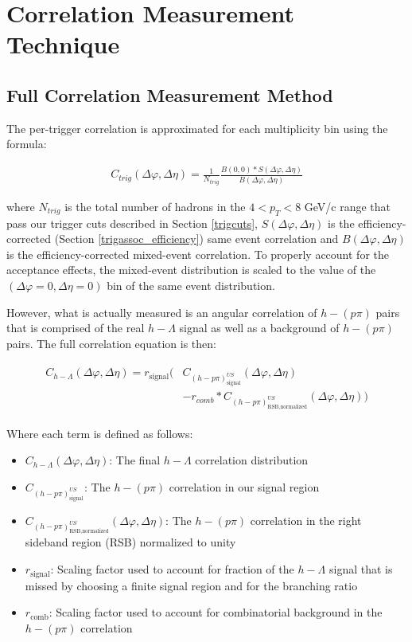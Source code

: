 \documentclass[ALICE,manyauthors]{ALICE_analysis_notes}
\begin{document}
\clearpage

\section{Correlation Measurement Technique}
\label{corrsec}

\subsection{Full Correlation Measurement Method}

The per-trigger correlation is approximated for each multiplicity bin using the formula:

\begin{align}
\label{corrEq}
C_{trig}(\Delta\varphi, \Delta\eta) = \frac{1}{N_{trig}}\frac{B(0,0)*S(\Delta\varphi,\Delta\eta)}{B(\Delta\varphi, \Delta\eta)}
\end{align}

where $N_{trig}$ is the total number of hadrons in the $4 < p_{T} < 8$ GeV/c range that pass our trigger cuts described in Section \ref{trigcuts}, $S(\Delta\varphi, \Delta\eta)$ is the efficiency-corrected (Section \ref{trigassoc_efficiency}) same event correlation and $B(\Delta\varphi, \Delta\eta)$ is the efficiency-corrected mixed-event correlation.  To properly account for the acceptance effects, the mixed-event distribution is scaled to the value of the $(\Delta\varphi = 0, \Delta\eta = 0)$ bin of the same event distribution.

However, what is actually measured is an angular correlation of $h-(p\pi)$ pairs that is comprised of the real $h-\Lambda$ signal as well as a background of $h-(p\pi)$ pairs. The full correlation equation is then:

\begin{align}
\label{corrEq_withBG}
\begin{split}
    C_{h-\Lambda}(\Delta\varphi, \Delta\eta) = r_{\text{signal}}\biggl(&C_{(h-p\pi)^{US}_{\text{signal}}}(\Delta\varphi, \Delta\eta)\\
    &- r_{comb}*C_{(h-p\pi)^{US}_{\text{RSB,normalized}}}(\Delta\varphi, \Delta\eta)\biggr)
\end{split}
\end{align}

Where each term is defined as follows:
\begin{itemize}
	\item $C_{h-\Lambda}(\Delta\varphi, \Delta\eta)$: The final $h-\Lambda$ correlation distribution
	\item $C_{(h-p\pi)^{US}_{\text{signal}}}$: The $h-(p\pi)$ correlation in our signal region
	\item $C_{(h-p\pi)^{US}_{\text{RSB,normalized}}}(\Delta\varphi, \Delta\eta)$: The $h-(p\pi)$ correlation in the right sideband region (RSB) normalized to unity
	\item $r_{\text{signal}}$: Scaling factor used to account for fraction of the $h-\Lambda$ signal that is missed by choosing a finite signal region and for the branching ratio
	\item $r_{\text{comb}}$: Scaling factor used to account for combinatorial background in the $h-(p\pi)$ correlation
\end{itemize}
\end{document}
